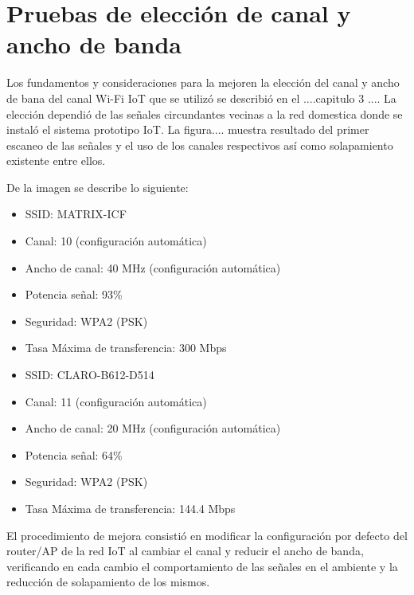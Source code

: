 
\section{Pruebas de elección de canal y ancho de banda}


Los fundamentos y consideraciones para la mejoren la elección del canal y ancho de bana del canal Wi-Fi IoT que se utilizó se describió en el ....capitulo 3 .... La elección dependió de las señales circundantes vecinas a la red domestica donde se instaló el sistema prototipo IoT. La figura.... muestra resultado del primer escaneo de las señales y el uso de los canales respectivos así como solapamiento existente entre ellos. 

De la imagen se describe lo siguiente:

\begin{itemize}
\item SSID: MATRIX-ICF
\item Canal: 10 (configuración automática)
\item Ancho de canal: 40 MHz (configuración automática)
\item Potencia señal: 93\%
\item Seguridad:  WPA2 (PSK)
\item Tasa Máxima de transferencia: 300 Mbps
\end{itemize}


\begin{itemize} 
\item SSID: CLARO-B612-D514
\item Canal: 11 (configuración automática)
\item Ancho de canal: 20 MHz (configuración automática)
\item Potencia señal: 64\%
\item Seguridad: WPA2 (PSK)
\item Tasa Máxima de transferencia: 144.4 Mbps
\end{itemize}

El procedimiento de mejora consistió en modificar la configuración por defecto del router/AP de la red IoT al cambiar el canal y reducir el ancho de banda, verificando en cada cambio el comportamiento de las señales en el ambiente y la reducción de solapamiento de los mismos.

